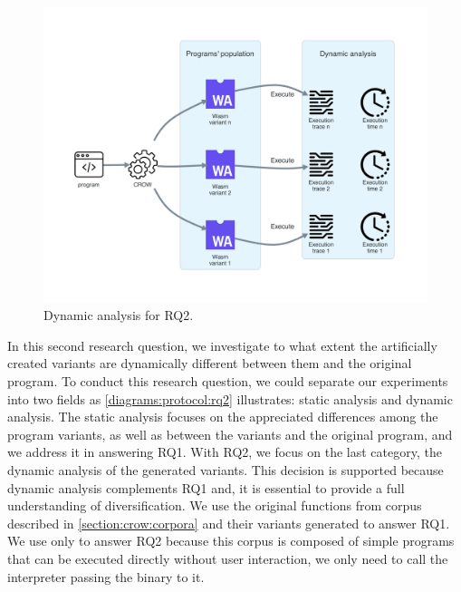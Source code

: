 
\section{\rqtwo}
\label{rq2:method}


\begin{figure}[h]
    \centering
    \includegraphics[width=\linewidth]{diagrams/Rq2.pdf}
    \caption{Dynamic analysis for RQ2.}
    \label{diagrams:protocol:rq2}
\end{figure}

In this second research question, we investigate to what extent the artificially created variants are dynamically different between them and the original program. To conduct this research question, we could separate our experiments into two fields as \autoref{diagrams:protocol:rq2} illustrates: static analysis and dynamic analysis. 
The static analysis focuses on the appreciated differences among the program variants, as well as between the variants and the original program, and we address it in answering RQ1. 
With RQ2, we focus on the last category, the dynamic analysis of the generated variants. This decision is supported because dynamic analysis complements RQ1 and, it is essential to provide a full understanding of diversification.
We use the original functions from \corpusrosetta corpus described in \autoref{section:crow:corpora} and their variants generated to answer RQ1. 
We use only \corpusrosetta to answer RQ2 because this corpus is composed of simple programs that can be executed directly without user interaction, \ie we only need to call the interpreter passing the \wasm binary to it. 


